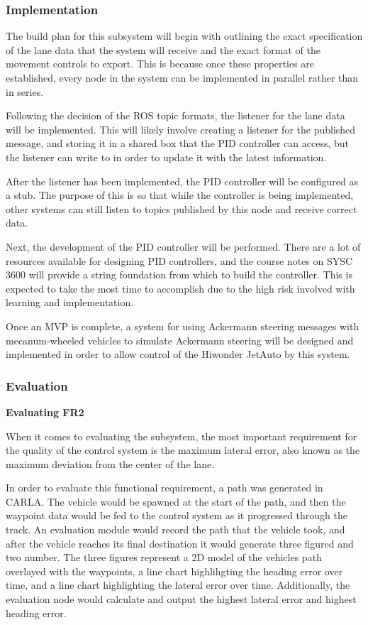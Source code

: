 \documentclass[titlepage]{article}
\begin{document}
\subsubsection{Implementation}
The build plan for this subsystem will begin with outlining the exact specification of the lane data that the system will receive and the exact format of the movement controls to export. This is because once these properties are established, every node in the system can be implemented in parallel rather than in series.

Following the decision of the ROS topic formats,  the listener for the lane data will be implemented. This will likely involve creating a listener for the published message, and storing it in a shared box that the PID controller can access, but the listener can write to in order to update it with the latest information.

After the listener has been implemented, the PID controller will be configured as a stub. The purpose of this is so that while the controller is being implemented, other systems can still listen to topics published by this node and receive correct data.

Next, the development of the PID controller will be performed. There are a lot of resources available for designing PID controllers, and the course notes on SYSC 3600 will provide a string foundation from which to build the controller. This is expected to take the most time to accomplish due to the high risk involved with learning and implementation. 

Once an MVP is complete, a system for using Ackermann steering messages with mecanum-wheeled vehicles to simulate Ackermann steering will be designed and implemented in order to allow control of the Hiwonder JetAuto by this system.

\subsubsection{Evaluation}
\textbf{Evaluating FR2}

When it comes to evaluating the subsystem, the most important requirement for the quality of the control system is the maximum lateral error, also known as the maximum deviation from the center of the lane.

In order to evaluate this functional requirement, a path was generated in CARLA. The vehicle would be spawned at the start of the path, and then the waypoint data would be fed to the control system as it progressed through the track. An evaluation module would record the path that the vehicle took, and after the vehicle reaches its final destination it would generate three figured and two number. The three figures represent a 2D model of the vehicles path overlayed with the waypoints, a line chart highlihgting the heading error over time, and a line chart highlighting the lateral error over time. Additionally, the evaluation node would calculate and output the highest lateral error and highest heading error. 
\end{document}
